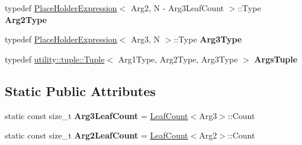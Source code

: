 \begin{DoxyCompactItemize}
\item 
\mbox{\label{struct_eigen_1_1_tensor_sycl_1_1internal_1_1_calculate_index_3_01_n_00_01_arg1_00_01_arg2_00_01_arg3_01_4_a7efe669793c73161008259569cbca9db}} 
typedef \hyperlink{struct_eigen_1_1_tensor_sycl_1_1internal_1_1_place_holder_expression}{Place\+Holder\+Expression}$<$ Arg2, N -\/ Arg3\+Leaf\+Count $>$\+::Type {\bfseries Arg2\+Type}
\item 
\mbox{\label{struct_eigen_1_1_tensor_sycl_1_1internal_1_1_calculate_index_3_01_n_00_01_arg1_00_01_arg2_00_01_arg3_01_4_ab515072a3d6e5a29ba7e6f6ae87e03fa}} 
typedef \hyperlink{struct_eigen_1_1_tensor_sycl_1_1internal_1_1_place_holder_expression}{Place\+Holder\+Expression}$<$ Arg3, N $>$\+::Type {\bfseries Arg3\+Type}
\item 
\mbox{\label{struct_eigen_1_1_tensor_sycl_1_1internal_1_1_calculate_index_3_01_n_00_01_arg1_00_01_arg2_00_01_arg3_01_4_a04aa5ebd256de4bd9361a5bcab0fbec8}} 
typedef \hyperlink{structutility_1_1tuple_1_1_tuple}{utility\+::tuple\+::\+Tuple}$<$ Arg1\+Type, Arg2\+Type, Arg3\+Type $>$ {\bfseries Args\+Tuple}
\end{DoxyCompactItemize}
\subsection*{Static Public Attributes}
\begin{DoxyCompactItemize}
\item 
\mbox{\label{struct_eigen_1_1_tensor_sycl_1_1internal_1_1_calculate_index_3_01_n_00_01_arg1_00_01_arg2_00_01_arg3_01_4_aeba57e02eb5987b3e907f69510880263}} 
static const size\+\_\+t {\bfseries Arg3\+Leaf\+Count} = \hyperlink{struct_eigen_1_1_tensor_sycl_1_1internal_1_1_leaf_count}{Leaf\+Count}$<$Arg3$>$\+::Count
\item 
\mbox{\label{struct_eigen_1_1_tensor_sycl_1_1internal_1_1_calculate_index_3_01_n_00_01_arg1_00_01_arg2_00_01_arg3_01_4_a6eac49056ac84b727c01fc4f89f915c7}} 
static const size\+\_\+t {\bfseries Arg2\+Leaf\+Count} = \hyperlink{struct_eigen_1_1_tensor_sycl_1_1internal_1_1_leaf_count}{Leaf\+Count}$<$Arg2$>$\+::Count
\end{DoxyCompactItemize}


